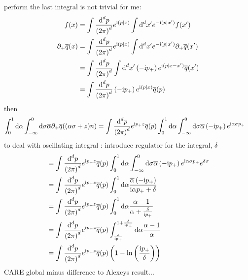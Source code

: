 perform the last integral is not trivial for me:
\begin{align}
	f(x) 
	&=
	\int \dxfm{p}{d} \expo^{\imag \skp{p}{x}} \int \dxfs{x'}{d} \expo^{-\imag\skp{p}{x'}} f(x')
	\\
	\partial_+\qbar(x) 
	&=
	\int \dxfm{p}{d} \expo^{\imag \skp{p}{x}} \int \dxfs{x'}{d} \expo^{-\imag\skp{p}{x'}} \partial_+\qbar(x')
	\\
	&=
	\int \dxfm{p}{d} \int \dxfs{x'}{d} \left(-\imag \pp\right)\expo^{\imag\skp{p}{x-x'}}\qbar(x')
	\\
	&=
	\int \dxfm{p}{d} \left(-\imag \pp\right)\expo^{\imag\skp{p}{x}}\qbar(p)
\end{align}
then 
\begin{align}
	\int _0^1\dx \alpha \int _{-\infty}^{0} \dx \sigma \overline \alpha \partial_+ \qbar((\alpha\sigma+z)n)
	&=
	\int \dxfm{p}{d}\expo^{\imag \pp z}\qbar(p)\int _0^1\dx \alpha \int _{-\infty}^{0} \dx \sigma \overline \alpha \left(-\imag \pp\right)\expo^{\imag \alpha \sigma \pp}
\end{align}
to deal with oscillating integral : introduce regulator for the integral, $\delta$
\begin{align}
	&=
	\int \dxfm{p}{d}\expo^{\imag \pp z}\qbar(p)\int _0^1\dx \alpha \int _{-\infty}^{0} \dx \sigma \overline \alpha\left(-\imag \pp\right) \expo^{\imag \alpha \sigma \pp}\expo^{\delta\sigma}
	\\
	&=
	\int \dxfm{p}{d}\expo^{\imag \pp z}\qbar(p)\int _0^1\dx \alpha  \frac{\overline \alpha \left(-\imag \pp\right)}{\imag \alpha \pp + \delta}
	\\
	&=
	\int \dxfm{p}{d}\expo^{\imag \pp z}\qbar(p)\int _0^1\dx \alpha  \frac{\alpha-1 }{\alpha + \frac{\delta}{\imag \pp}}
	\\
		&=
	\int \dxfm{p}{d}\expo^{\imag \pp z}\qbar(p)\int _{\frac{\delta}{\imag \pp}}^{1+\frac{\delta}{\imag \pp}}\dx \alpha  \frac{\alpha-1 }{\alpha}
	\\
	&=
	\int \dxfm{p}{d}\expo^{\imag \pp z}\qbar(p) \left(1-\ln\left(\frac{\imag \pp}{\delta}\right)\right)
\end{align}
CARE global minus difference to Alexeys result...  
